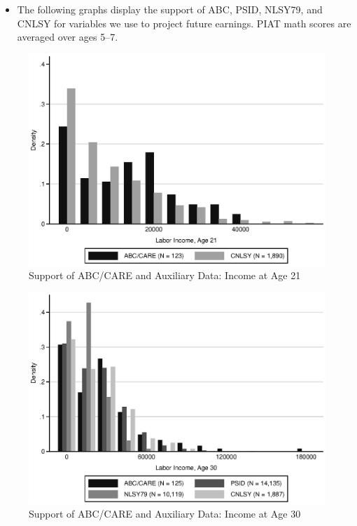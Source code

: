 \documentclass[static]{JJH-Beamer}
\begin{document}

\begin{itemize}
\item The following graphs display the support of ABC, PSID, NLSY79, and CNLSY for variables we use to project future earnings. PIAT math scores are averaged over ages 5--7.
\end{itemize}

\begin{frame}

\begin{figure}[H]
\caption{Support of ABC/CARE and Auxiliary Data: Income at Age 21} \label{fig:support}
\begin{center}
\includegraphics[width=.75\textwidth]{AppOutput/Methodology/support_inc21.eps}
\end{center}
\end{figure}

\end{frame}

\begin{frame}

\begin{figure}[H]\addtocounter{figure}{-1}
\caption{Support of ABC/CARE and Auxiliary Data: Income at Age 30} \label{fig:support}
\begin{center}
\includegraphics[width=.75\textwidth]{AppOutput/Methodology/support_inc30.eps}
\end{center}
\end{figure}

\end{frame}
\end{document}
